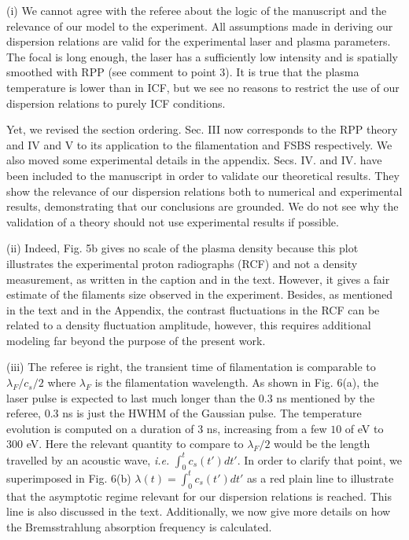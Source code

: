 \documentclass{article}
\begin{document}
(i) We cannot agree with the referee about the logic of the manuscript and the relevance of our model to the experiment. 
All assumptions made in deriving our dispersion relations are valid for the experimental laser and plasma parameters. The focal is long enough, the laser has a sufficiently low intensity and is spatially smoothed with RPP (see comment to point 3). It is true that the  plasma temperature is lower than in  ICF, but we see no reasons to  restrict the use of our dispersion relations to purely ICF conditions.

Yet, we revised the section ordering.  Sec. III now corresponds to the RPP theory and IV and V to its application to   the filamentation and FSBS respectively. We also moved some experimental details in the appendix. 
Secs.  IV. and IV. have been included to the manuscript in order to  validate our theoretical results. They show the relevance of our dispersion relations both to numerical and experimental results, demonstrating that our conclusions are grounded. We do not see why the validation of a theory should not use experimental results if possible.

(ii) Indeed, Fig. 5b gives no scale of the plasma density because this plot illustrates the experimental proton radiographs (RCF)  and not a density measurement, as written in the caption and in the text. However, it gives a fair estimate of the filaments size observed in the experiment. Besides, as mentioned in the text and in the Appendix, the contrast fluctuations in the RCF can be related to a density fluctuation amplitude, however, this requires additional modeling far beyond the purpose of the present work.

(iii) The referee is right, the transient time of filamentation is comparable to $\lambda_F/c_s/2$ where $\lambda_F$ is the filamentation wavelength. As shown in Fig. 6(a), the laser pulse is expected to last much longer than the 0.3 ns mentioned by the referee, 0.3 ns is just the HWHM of the Gaussian pulse. The temperature evolution is computed on a duration of 3 ns, increasing from  a few $10$ of eV to $300$ eV. Here the relevant quantity to compare to $\lambda_F/2$ would be the length travelled by an acoustic wave, \emph{i.e.}  $\int_0^t c_s(t')dt'$. 
In order to clarify that point, we superimposed in Fig. 6(b) $\lambda (t) =\int_0^t c_s(t')dt'$ as a red plain line  to illustrate that the asymptotic regime relevant for our dispersion relations is reached. This line is also discussed in the text.
Additionally, we now give more details on how the Bremsstrahlung absorption frequency is calculated.
\end{document}
